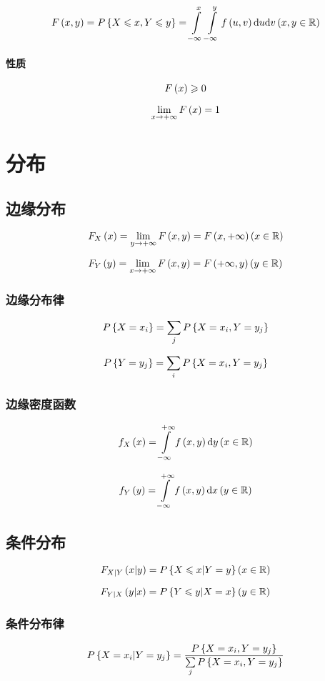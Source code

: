 \documentclass{article}
\begin{document}
\[F\left(x,y\right)=P\left\{X\leqslant x,Y\leqslant y\right\}=\int\limits_{-\infty}^x\int\limits_{-\infty}^yf\left(u,v\right)\mathrm d u\mathrm d v\left(x,y\in\mathbb R\right)\]

\paragraph{性质}

\[F\left(x\right)\geqslant0\]

\[\lim_{x\to+\infty}F\left(x\right)=1\]

\section{分布}

\subsection{边缘分布}

\[F_X\left(x\right)=\lim_{y\to+\infty}F\left(x,y\right)=F\left(x,+\infty\right)\left(x\in\mathbb R\right)\]

\[F_Y\left(y\right)=\lim_{x\to+\infty}F\left(x,y\right)=F\left(+\infty,y\right)\left(y\in\mathbb R\right)\]

\subsubsection{边缘分布律}

\[P\left\{X=x_i\right\}=\sum_jP\left\{X=x_i,Y=y_j\right\}\]

\[P\left\{Y=y_j\right\}=\sum_iP\left\{X=x_i,Y=y_j\right\}\]

\subsubsection{边缘密度函数}

\[f_X\left(x\right)=\int\limits_{-\infty}^{+\infty} f\left(x,y\right)\mathrm d y\left(x\in\mathbb R\right)\]

\[f_Y\left(y\right)=\int\limits_{-\infty}^{+\infty} f\left(x,y\right)\mathrm d x\left(y\in\mathbb R\right)\]

\subsection{条件分布}

\[F_{X|Y}\left(x|y\right)=P\left\{X\leqslant x|Y=y\right\}\left(x\in\mathbb R\right)\]

\[F_{Y|X}\left(y|x\right)=P\left\{Y\leqslant y|X=x\right\}\left(y\in\mathbb R\right)\]

\subsubsection{条件分布律}

\[P\left\{X=x_i|Y=y_j\right\}=\frac{P\left\{X=x_i,Y=y_j\right\}}{\sum\limits_jP\left\{X=x_i,Y=y_j\right\}}\]
\end{document}
